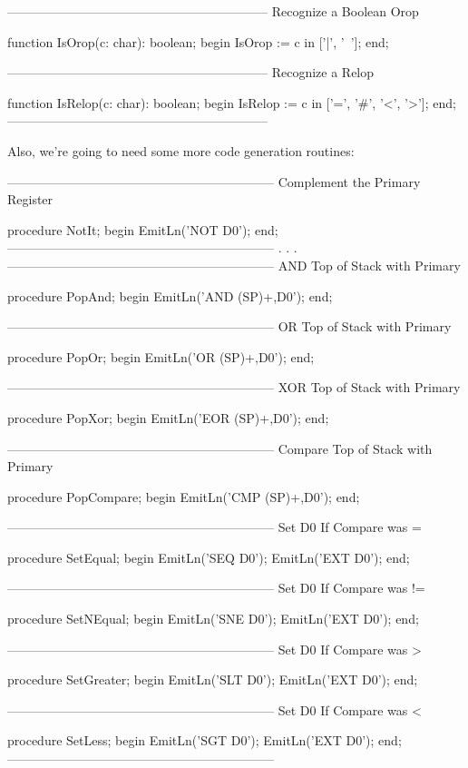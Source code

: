 \documentclass[float=false, crop=false]{standalone}
\begin{document}
\begin{code}
{--------------------------------------------------------------}
{ Recognize a Boolean Orop }

function IsOrop(c: char): boolean;
begin
   IsOrop := c in ['|', '~'];
end;


{--------------------------------------------------------------}
{ Recognize a Relop }

function IsRelop(c: char): boolean;
begin
   IsRelop := c in ['=', '#', '<', '>'];
end;
{--------------------------------------------------------------}


Also, we're going to need some more code generation routines:


{---------------------------------------------------------------}
{ Complement the Primary Register }

procedure NotIt;
begin
   EmitLn('NOT D0');
end;
{---------------------------------------------------------------}
.
.
.
{---------------------------------------------------------------}
{ AND Top of Stack with Primary }

procedure PopAnd;
begin
   EmitLn('AND (SP)+,D0');
end;


{---------------------------------------------------------------}
{ OR Top of Stack with Primary }

procedure PopOr;
begin
   EmitLn('OR (SP)+,D0');
end;


{---------------------------------------------------------------}
{ XOR Top of Stack with Primary }

procedure PopXor;
begin
   EmitLn('EOR (SP)+,D0');
end;


{---------------------------------------------------------------}
{ Compare Top of Stack with Primary }

procedure PopCompare;
begin
   EmitLn('CMP (SP)+,D0');
end;


{---------------------------------------------------------------}
{ Set D0 If Compare was = }

procedure SetEqual;
begin
   EmitLn('SEQ D0');
   EmitLn('EXT D0');
end;


{---------------------------------------------------------------}
{ Set D0 If Compare was != }

procedure SetNEqual;
begin
   EmitLn('SNE D0');
   EmitLn('EXT D0');
end;


{---------------------------------------------------------------}
{ Set D0 If Compare was > }

procedure SetGreater;
begin
   EmitLn('SLT D0');
   EmitLn('EXT D0');
end;


{---------------------------------------------------------------}
{ Set D0 If Compare was < }

procedure SetLess;
begin
   EmitLn('SGT D0');
   EmitLn('EXT D0');
end;
{---------------------------------------------------------------}
\end{code}
\end{document}
